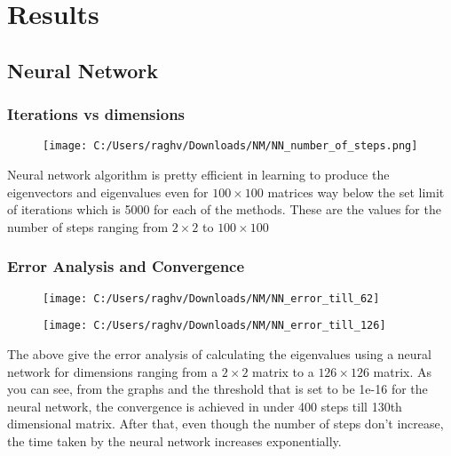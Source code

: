 \documentclass{article}
\begin{document}
\section{Results}
\subsection{Neural Network}
\subsubsection{Iterations vs dimensions}

\begin{figure}[h]
    \centering
    \texttt{[image: C:/Users/raghv/Downloads/NM/NN\_number\_of\_steps.png]}
    \label{fig:image2}
\end{figure}

Neural network algorithm is pretty efficient in learning to produce the eigenvectors and eigenvalues even for $100 \times 100$ matrices way below the set limit of iterations which is 5000 for each of the methods. These are the values for the number of steps ranging from $2 \times 2$ to $100 \times 100$

\subsubsection{Error Analysis and Convergence}

\begin{figure}[h]
    \centering
    \texttt{[image: C:/Users/raghv/Downloads/NM/NN\_error\_till\_62]}
    \label{fig:image2}
\end{figure}

\begin{figure}[h]
    \centering
    \texttt{[image: C:/Users/raghv/Downloads/NM/NN\_error\_till\_126]}
    \label{fig:image2}
\end{figure}

The above give the error analysis of calculating the eigenvalues using a neural network for dimensions ranging from a $2 \times 2$ matrix to a $126 \times 126$ matrix. As you can see, from the graphs and the threshold that is set to be 1e-16 for the neural network, the convergence is achieved in under 400 steps till 130th dimensional matrix. After that, even though the number of steps don't increase, the time taken by the neural network increases exponentially.
\\
\\
\\
\end{document}
